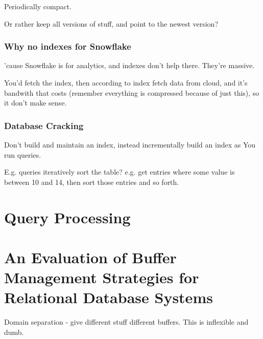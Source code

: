 \documentclass{article}
\begin{document}
				Periodically compact.
				
				Or rather keep all versions of stuff, and point to the newest version?
				
			\subsubsection{Why no indexes for Snowflake}
			
				'cause Snowflake is for analytics, and indexes don't help there. They're massive.
				
				You'd fetch the index, then according to index fetch data from cloud, and it's bandwith that costs (remember everything is compressed because of just this), so it don't make sense.
				
			\subsubsection{Database Cracking}
			
				Don't build and maintain an index, instead incrementally build an index as You run queries.
				
				E.g. queries iteratively sort the table? e.g. get entries where some value is between 10 and 14, then sort those entries and so forth.
				
\newpage
\section{Query Processing}

	
				
				
				
				
				
				
				
				
				
				
                                                                                                                                   		
			
			
			
			
			
			
\newpage\phantom{asd}
\newpage
\section{An Evaluation of Buffer Management Strategies for
Relational Database Systems}

	Domain separation - give different stuff different buffers. This is inflexible and dumb.
	
\end{document}
